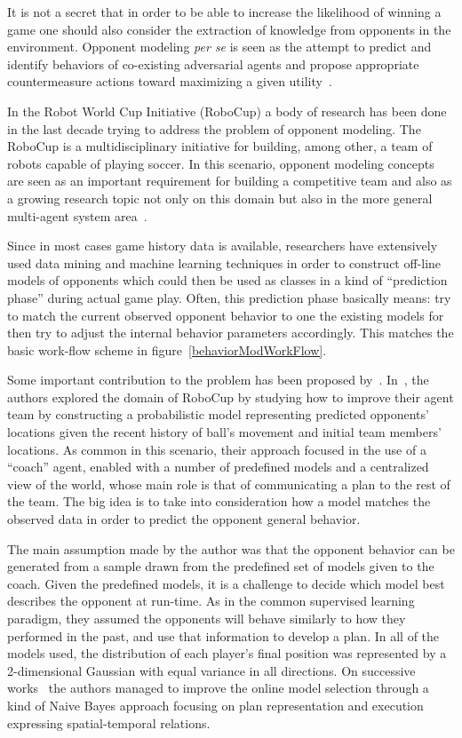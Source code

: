It is not a secret that in order to be able to increase the likelihood of winning a game one should also consider the extraction of knowledge from opponents in the environment. Opponent modeling \textit{per se} is seen as the attempt to predict and identify behaviors of co-existing adversarial agents and propose appropriate countermeasure actions toward maximizing a given utility~\citep{fathzadeh_opponent_2007}.

In the Robot World Cup Initiative (RoboCup) a body of research has been done in the last decade trying to address the problem of opponent modeling. The RoboCup is a multidisciplinary initiative for building, among other, a team of robots capable of playing soccer. In this scenario, opponent modeling concepts are seen as an important requirement for building a competitive team and also as a growing research topic not only on this domain but also in the more general multi-agent system area~\citep{rofer_overview_2012}. 

Since in most cases game history data is available, researchers have extensively used data mining and machine learning techniques in order to construct off-line models of opponents which could then be used as classes in a kind of ``prediction phase'' during actual game play. Often, this prediction phase basically means: try to match the current observed opponent behavior to one the existing models for then try to adjust the internal behavior parameters accordingly. This matches the basic work-flow scheme in figure~\ref{behaviorModWorkFlow}.

Some important contribution to the problem has been proposed by~\citep{fix_behavior_2000,riley_recognizing_2002,riley_coaching_2001,riley_planning_2002}. In~\cite{riley_recognizing_2002}, the authors explored the domain of RoboCup by studying how to improve their agent team by constructing a probabilistic model representing predicted opponents' locations given the recent history of ball's movement and initial team members' locations. As common in this scenario, their approach focused in the use of a ``coach'' agent, enabled with a number of predefined models and a centralized view of the world, whose main role is that of communicating a plan to the rest of the team. The big idea is to take into consideration how a model matches the observed data in order to predict the opponent general behavior. 

The main assumption made by the author was that the opponent behavior can be generated from a sample drawn from the predefined set of models given to the coach. Given the predefined models, it is a challenge to decide which model best describes the opponent at run-time. As in the common supervised learning paradigm, they assumed the opponents will behave similarly to how they performed in the past, and use that information to develop a plan. In all of the models used, the distribution of each player's final position was represented by a 2-dimensional Gaussian with equal variance in all directions. On successive works~\citep{riley_coaching_2001,riley_planning_2002} the authors managed to improve the online model selection through a kind of Naive Bayes approach focusing on plan representation and execution expressing spatial-temporal relations. 

